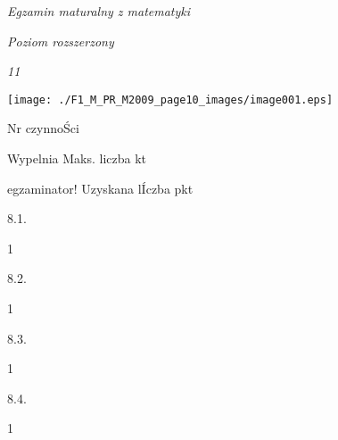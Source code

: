 \documentclass[a4paper,12pt]{article}
\begin{document}
{\it Egzamin maturalny z matematyki}

{\it Poziom rozszerzony}

{\it 11}
\begin{center}
\texttt{[image: ./F1\_M\_PR\_M2009\_page10\_images/image001.eps]}
\end{center}
Nr czynnoŚci

Wypelnia Maks. liczba kt

egzaminator! Uzyskana lÍczba pkt

8.1.

1

8.2.

1

8.3.

1

8.4.

1
\end{document}
